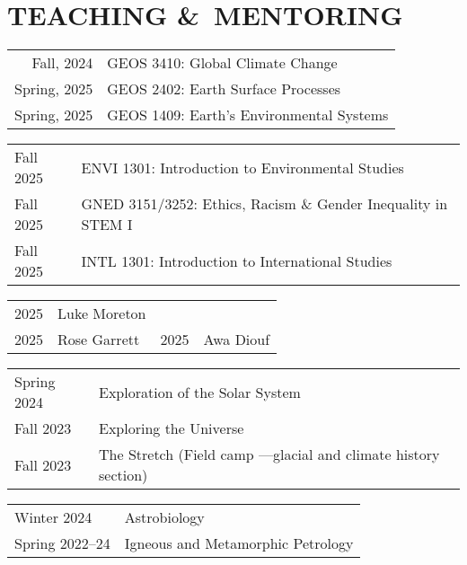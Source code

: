 \section{TEACHING \&\ MENTORING}
\begin{tabular}{r l} %
	Fall, 2024\ongoing & GEOS 3410: Global Climate Change\\
	Spring, 2025\ongoing & GEOS 2402: Earth Surface Processes\\
	Spring, 2025\ongoing & GEOS 1409: Earth's Environmental Systems\\
\end{tabular}

\begin{tabular}{l l} %
	Fall 2025 & ENVI 1301: Introduction to Environmental Studies \\
	Fall 2025 & GNED 3151/3252: Ethics, Racism \& Gender Inequality in STEM I\\
	Fall 2025 & INTL 1301: Introduction to International Studies
\end{tabular}

\begin{tabular}{ll|ll}
	2025\ongoing & Luke Moreton
	\\
	2025\ongoing & Rose Garrett
	&
	2025\ongoing & Awa Diouf
\end{tabular}

\begin{tabular}{l l}
	Spring 2024 & Exploration of the Solar System \\
	Fall 2023 & Exploring the Universe \\
	Fall 2023 & The Stretch \normalfont (Field camp ---glacial and climate history section)
\end{tabular}

\begin{tabular}{p{.15\linewidth} l} %
	Winter 2024 & Astrobiology\\
	Spring 2022--24 & Igneous and Metamorphic Petrology
\end{tabular}

